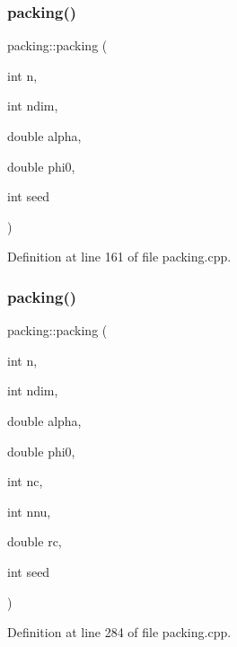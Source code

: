 \mbox{\label{classpacking_a954ef88de3bcf03906e7b9c1511c4338}} 
\subsubsection{\texorpdfstring{packing()}{packing()}\hspace{0.1cm}{\footnotesize\ttfamily [3/4]}}
{\footnotesize\ttfamily packing\+::packing (\begin{DoxyParamCaption}\item[{int}]{n,  }\item[{int}]{ndim,  }\item[{double}]{alpha,  }\item[{double}]{phi0,  }\item[{int}]{seed }\end{DoxyParamCaption})}



Definition at line 161 of file packing.\+cpp.

\mbox{\label{classpacking_ae34dd16515628814825132a9dbf06543}} 
\subsubsection{\texorpdfstring{packing()}{packing()}\hspace{0.1cm}{\footnotesize\ttfamily [4/4]}}
{\footnotesize\ttfamily packing\+::packing (\begin{DoxyParamCaption}\item[{int}]{n,  }\item[{int}]{ndim,  }\item[{double}]{alpha,  }\item[{double}]{phi0,  }\item[{int}]{nc,  }\item[{int}]{nnu,  }\item[{double}]{rc,  }\item[{int}]{seed }\end{DoxyParamCaption})}



Definition at line 284 of file packing.\+cpp.

\mbox{\label{classpacking_a985cd1712c1e0c7e9f3927e847383810}} 
